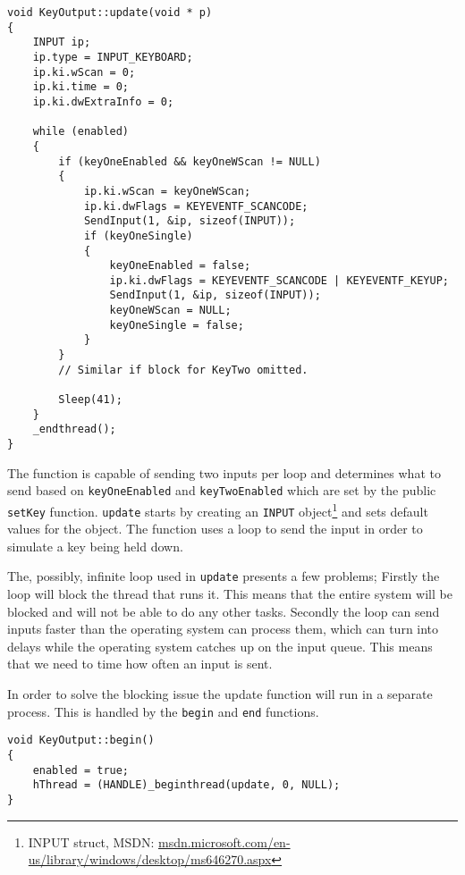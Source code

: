 \begin{lstlisting}[caption=KeyOutput loop function, label=lst:lst11]
void KeyOutput::update(void * p) 
{ 
    INPUT ip;
    ip.type = INPUT_KEYBOARD;
    ip.ki.wScan = 0;
    ip.ki.time = 0;
    ip.ki.dwExtraInfo = 0;

    while (enabled)
    { 
        if (keyOneEnabled && keyOneWScan != NULL) 
        { 
            ip.ki.wScan = keyOneWScan;
            ip.ki.dwFlags = KEYEVENTF_SCANCODE;
            SendInput(1, &ip, sizeof(INPUT));
            if (keyOneSingle) 
            {
                keyOneEnabled = false;
                ip.ki.dwFlags = KEYEVENTF_SCANCODE | KEYEVENTF_KEYUP;
                SendInput(1, &ip, sizeof(INPUT));
                keyOneWScan = NULL;
                keyOneSingle = false; 
            } 
        }
        // Similar if block for KeyTwo omitted. 
        
        Sleep(41);
    } 
    _endthread(); 
}
\end{lstlisting}

The function is capable of sending two inputs per loop and determines what to send based on \texttt{keyOneEnabled} and \texttt{keyTwoEnabled} which are set by the public \texttt{setKey} function. 
\texttt{update} starts by creating an \texttt{INPUT}
object\footnote{INPUT struct, MSDN: \url{msdn.microsoft.com/en-us/library/windows/desktop/ms646270.aspx}} and sets default values for the object. 
The function uses a loop to send the input in order to simulate a key being held down.
\bigskip

The, possibly, infinite loop used in \texttt{update} presents a few problems;
Firstly the loop will block the thread that runs it. This means that the entire
system will be blocked and will not be able to do any other tasks. Secondly the
loop can send inputs faster than the operating system can process them, which
can turn into delays while the operating system catches up on the input queue.
This means that we need to time how often an input is sent.
\bigskip

In order to solve the blocking issue the update function will run in a separate
process. This is handled by the \texttt{begin} and \texttt{end} functions.
\bigskip

\begin{lstlisting}[caption=KeyOutput begin thread function, label=lst:lst12]
void KeyOutput::begin() 
{ 
    enabled = true;
    hThread = (HANDLE)_beginthread(update, 0, NULL);
}
\end{lstlisting}

